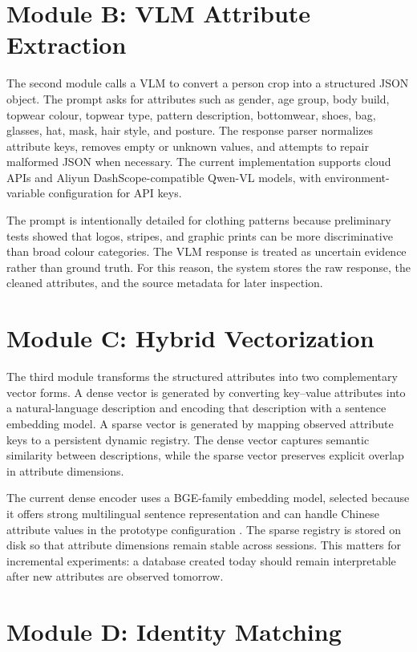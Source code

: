 \section{Module B: VLM Attribute Extraction}

The second module calls a VLM to convert a person crop into a structured JSON object. The prompt asks for attributes such as gender, age group, body build, topwear colour, topwear type, pattern description, bottomwear, shoes, bag, glasses, hat, mask, hair style, and posture. The response parser normalizes attribute keys, removes empty or unknown values, and attempts to repair malformed JSON when necessary. The current implementation supports cloud APIs and Aliyun DashScope-compatible Qwen-VL models, with environment-variable configuration for API keys.

The prompt is intentionally detailed for clothing patterns because preliminary tests showed that logos, stripes, and graphic prints can be more discriminative than broad colour categories. The VLM response is treated as uncertain evidence rather than ground truth. For this reason, the system stores the raw response, the cleaned attributes, and the source metadata for later inspection.

\section{Module C: Hybrid Vectorization}

The third module transforms the structured attributes into two complementary vector forms. A dense vector is generated by converting key--value attributes into a natural-language description and encoding that description with a sentence embedding model. A sparse vector is generated by mapping observed attribute keys to a persistent dynamic registry. The dense vector captures semantic similarity between descriptions, while the sparse vector preserves explicit overlap in attribute dimensions.

The current dense encoder uses a BGE-family embedding model, selected because it offers strong multilingual sentence representation and can handle Chinese attribute values in the prototype configuration \citep{xiao2023cpack}. The sparse registry is stored on disk so that attribute dimensions remain stable across sessions. This matters for incremental experiments: a database created today should remain interpretable after new attributes are observed tomorrow.

\section{Module D: Identity Matching}

